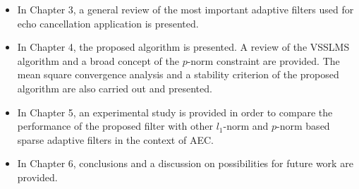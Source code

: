 \vspace{-0.8cm}
\begin{itemize}
  \item  In Chapter 3, a general review of the most important adaptive filters used for echo cancellation application is presented. %
\vspace{-0.3cm}
  \item In Chapter 4, the proposed algorithm is presented. A review of the VSSLMS algorithm and a broad concept of the $p$-norm constraint are provided. The mean square convergence analysis and a stability criterion of the proposed algorithm are also carried out and presented.
\vspace{-0.3cm}
  \item In Chapter 5, an experimental study is provided in order to compare the performance of the proposed filter with other $l_1$-norm and $p$-norm based sparse adaptive filters  in the context of AEC.
\vspace{-0.3cm}
  \item In Chapter 6, conclusions and a discussion on possibilities for future work are provided.
\end{itemize}

\vspace{-0.5cm}
